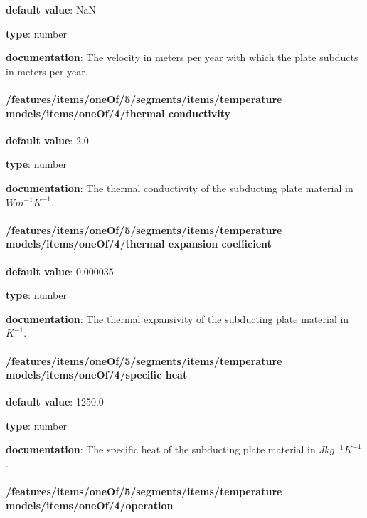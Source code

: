 \begin{itemized}
\item {\bf default value}: NaN
\item {\bf type}: number
\item {\bf documentation}: The velocity in meters per year with which the plate subducts in meters per year.
\end{itemized}\paragraph{/features/items/oneOf/5/segments/items/temperature models/items/oneOf/4/thermal conductivity} \begin{itemized}
\item {\bf default value}: 2.0
\item {\bf type}: number
\item {\bf documentation}: The thermal conductivity of the subducting plate material in $W m^{-1} K^{-1}$.
\end{itemized}\paragraph{/features/items/oneOf/5/segments/items/temperature models/items/oneOf/4/thermal expansion coefficient} \begin{itemized}
\item {\bf default value}: 0.000035
\item {\bf type}: number
\item {\bf documentation}: The thermal expansivity of the subducting plate material in $K^{-1}$.
\end{itemized}\paragraph{/features/items/oneOf/5/segments/items/temperature models/items/oneOf/4/specific heat} \begin{itemized}
\item {\bf default value}: 1250.0
\item {\bf type}: number
\item {\bf documentation}: The specific heat of the subducting plate material in $J kg^{-1} K^{-1}$.
\end{itemized}\paragraph{/features/items/oneOf/5/segments/items/temperature models/items/oneOf/4/operation} \begin{itemized}

\end{itemized}
